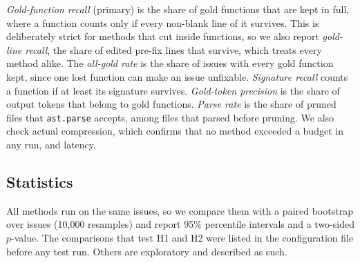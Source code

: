 \emph{Gold-function recall} (primary) is the share of gold functions that are kept in full, where a function counts only if every non-blank line of it survives. This is deliberately strict for methods that cut inside functions, so we also report \emph{gold-line recall}, the share of edited pre-fix lines that survive, which treats every method alike. The \emph{all-gold rate} is the share of issues with every gold function kept, since one lost function can make an issue unfixable. \emph{Signature recall} counts a function if at least its signature survives. \emph{Gold-token precision} is the share of output tokens that belong to gold functions. \emph{Parse rate} is the share of pruned files that \texttt{ast.parse} accepts, among files that parsed before pruning. We also check actual compression, which confirms that no method exceeded a budget in any run, and latency.

\subsection{Statistics}

All methods run on the same issues, so we compare them with a paired bootstrap over issues (10{,}000 resamples) and report 95\% percentile intervals and a two-sided $p$-value. The comparisons that test H1 and H2 were listed in the configuration file before any test run. Others are exploratory and described as such.
